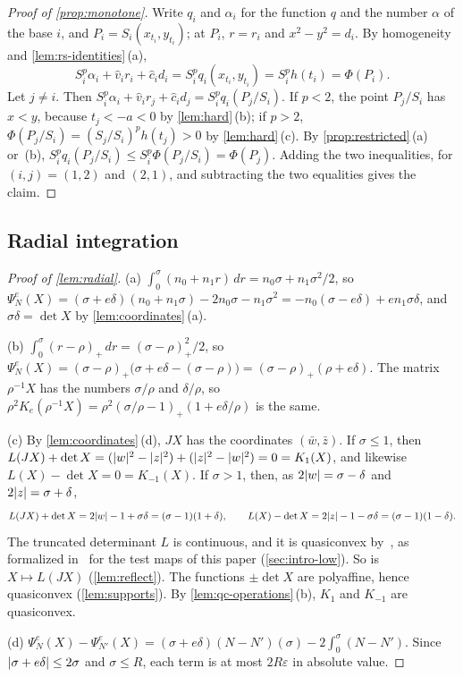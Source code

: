 \begin{proof}[Proof of \cref{prop:monotone}]
Write $q_i$ and $\alpha_i$ for the function $q$ and the number $\alpha$ of the base $i$, and
$P_i=S_i(x_{t_i},y_{t_i})$; at $P_i$, $r=r_i$ and $x^2-y^2=d_i$. By homogeneity and
\cref{lem:rs-identities}\,(a),
\[
  S_i^p\alpha_i+\hat v_ir_i+\hat c_id_i=S_i^pq_i(x_{t_i},y_{t_i})=S_i^ph(t_i)=\Phi(P_i).
\]
Let $j\ne i$. Then $S_i^p\alpha_i+\hat v_ir_j+\hat c_id_j=S_i^pq_i(P_j/S_i)$. If $p<2$, the point
$P_j/S_i$ has $x<y$, because $t_j<-a<0$ by \cref{lem:hard}\,(b); if $p>2$,
$\Phi(P_j/S_i)=(S_j/S_i)^ph(t_j)>0$ by \cref{lem:hard}\,(c). By \cref{prop:restricted}\,(a)
or~(b), $S_i^pq_i(P_j/S_i)\le S_i^p\Phi(P_j/S_i)=\Phi(P_j)$. Adding the two inequalities, for
$(i,j)=(1,2)$ and $(2,1)$, and subtracting the two equalities gives the claim.
\end{proof}

\subsection{Radial integration}

\begin{proof}[Proof of \cref{lem:radial}]
(a) $\int_0^\sigma(n_0+n_1r)\,dr=n_0\sigma+n_1\sigma^2/2$, so
$\Psi^e_N(X)=(\sigma+e\delta)(n_0+n_1\sigma)-2n_0\sigma-n_1\sigma^2=-n_0(\sigma-e\delta)
+en_1\sigma\delta$, and $\sigma\delta=\det X$ by \cref{lem:coordinates}\,(a).

(b) $\int_0^\sigma(r-\rho)_+\,dr=(\sigma-\rho)_+^2/2$, so
$\Psi^e_N(X)=(\sigma-\rho)_+\bigl(\sigma+e\delta-(\sigma-\rho)\bigr)=(\sigma-\rho)_+(\rho+e\delta)$.
The matrix $\rho^{-1}X$ has the numbers $\sigma/\rho$ and $\delta/\rho$, so
$\rho^2K_e(\rho^{-1}X)=\rho^2(\sigma/\rho-1)_+(1+e\delta/\rho)$ is the same.

(c) By \cref{lem:coordinates}\,(d), $JX$ has the coordinates $(\bar w,\bar z)$. If $\sigma\le1$,
then $L(JX)+\det X=(\lvert w\rvert^2-\lvert z\rvert^2)+(\lvert z\rvert^2-\lvert w\rvert^2)=0=K_1(X)$, and likewise
$L(X)-\det X=0=K_{-1}(X)$. If $\sigma>1$, then, as $2\lvert w\rvert=\sigma-\delta$ and
$2\lvert z\rvert=\sigma+\delta$,
\[
  L(JX)+\det X=2\lvert w\rvert-1+\sigma\delta=(\sigma-1)(1+\delta),\qquad
  L(X)-\det X=2\lvert z\rvert-1-\sigma\delta=(\sigma-1)(1-\delta).
\]
The truncated determinant $L$ is continuous, and it is quasiconvex
by~\cite[Theorem~1]{SharpHI}, as formalized in~\cite{IwaniecLean} for the test maps of this
paper (\cref{sec:intro-low}). So is $X\mapsto L(JX)$ (\cref{lem:reflect}). The functions
$\pm\det X$ are polyaffine, hence quasiconvex (\cref{lem:supports}). By
\cref{lem:qc-operations}\,(b), $K_1$ and $K_{-1}$ are quasiconvex.

(d) $\Psi^e_N(X)-\Psi^e_{N'}(X)=(\sigma+e\delta)(N-N')(\sigma)-2\int_0^\sigma(N-N')$. Since
$\lvert \sigma+e\delta\rvert\le2\sigma$ and $\sigma\le R$, each term is at most $2R\varepsilon$ in
absolute value.
\end{proof}


